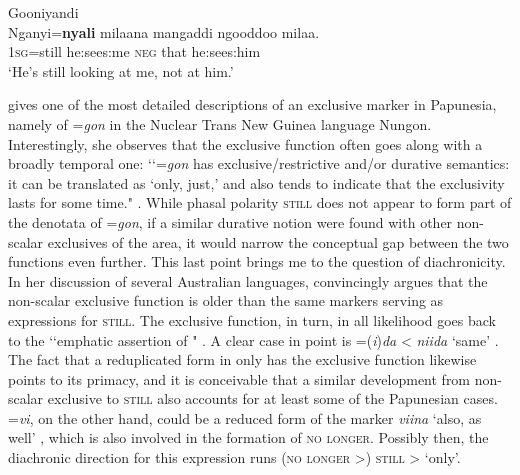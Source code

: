 \begin{exe}

	\ex Gooniyandi\label{exRestrictiveGooniyandi1}\\
	\gll Nganyi=\textbf{nyali} milaana mangaddi ngooddoo milaa.\\
	1\textsc{sg}=still he:sees:me \textsc{neg} that he:sees:him\\
	\glt \lq He’s still looking at me, not at him.' \parencite[464]{McGregor1990}
\end{exe}

\textcite[412–421]{Sarvasy2017} gives one of the most detailed descriptions of an exclusive marker in Papunesia, namely of \mbox{=\textit{gon}} in the Nuclear Trans New Guinea language Nungon. Interestingly, she observes that the exclusive function often goes along with a broadly temporal one: \lq\lq \mbox{=\textit{gon}} has exclusive/restrictive and/or durative semantics: it can be translated as \lq only, just,' and also tends to indicate that the exclusivity lasts for some time." \parencite[412]{Sarvasy2017}. While phasal polarity \textsc{still} does not appear to form part of the denotata of  \mbox{=\textit{gon}}, if a similar durative notion were found with other non-scalar exclusives of the area, it would narrow the conceptual gap between the two functions even further. This last point brings me to the question of diachronicity. In her discussion of several Australian languages, \textcite{SchultzeBerndt2002} convincingly argues that the non-scalar exclusive function is older than the same markers serving as expressions for \textsc{still}. The exclusive function, in turn, in all likelihood goes back to the \lq\lq emphatic assertion of " \parencite[120]{Koenig1991}. A clear case in point is  \mbox{=(\textit{i})\textit{da}} < \textit{niida} \lq same' \parencite[389–390]{Evans1995}. The fact that a reduplicated form in  only has the exclusive function likewise points to its primacy, and it is conceivable that a similar development from non-scalar exclusive to \textsc{still}  also accounts for at least some of the Papunesian cases.  \mbox{=\textit{vi}}, on the other hand, could be a reduced form of the  marker \textit{viina} \lq also, as well' \parencite{Guerois2021}, which is also involved in the formation of \textsc{no longer}. Possibly then, the diachronic direction for this expression runs (\textsc{no longer} >) \textsc{still} > \lq only'.


